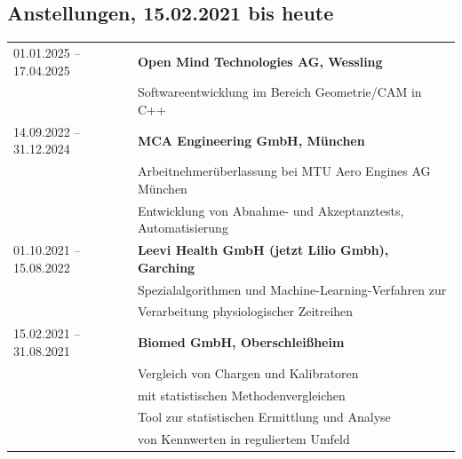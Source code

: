 \documentclass[12pt,a4paper]{article}
\begin{document}
\subsection*{Anstellungen, 15.02.2021 bis heute}
\begin{tabular}{l|l}
01.01.2025 -- 17.04.2025 & {\bf Open Mind Technologies AG, Wessling}\\
& Softwareentwicklung im Bereich Geometrie/CAM in C++\\
%
14.09.2022 -- 31.12.2024 & {\bf MCA Engineering GmbH, München}\\
& Arbeitnehmerüberlassung bei MTU Aero Engines AG München\\
& Entwicklung von Abnahme- und Akzeptanztests, Automatisierung\\
%
01.10.2021 -- 15.08.2022 & {\bf Leevi Health GmbH (jetzt Lilio Gmbh), Garching}\\
& Spezialalgorithmen und Machine-Learning-Verfahren zur \\
& Verarbeitung physiologischer Zeitreihen\\
%
15.02.2021 -- 31.08.2021 & {\bf Biomed GmbH, Oberschleißheim}\\
& Vergleich von Chargen und Kalibratoren \\
& mit statistischen Methodenvergleichen\\
& Tool zur statistischen Ermittlung und Analyse\\
& von Kennwerten in reguliertem Umfeld\\
%
\end{tabular}
%
\end{document}
